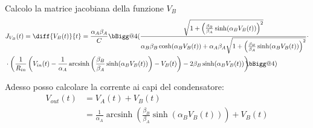 \documentclass[12pt,a4paper,twoside,english,italian]{book}
\makeatletter
\DeclareMathOperator{\arcsinh}{arcsinh}
\newcommand{\reallybig}{\bBigg@{4}}
\makeatother
\begin{document}
		Calcolo la matrice jacobiana della funzione $V_{B}$
		\begin{equation}
			\label{eq:jacobiana}
			\begin{split}
				&J_{V_{B}}(t) = \diff{V_{B}(t)}{t} = \frac{\alpha_{A}\beta_{A}}{C}\reallybig(\frac{\sqrt{1+\left(\frac{\beta_{B}}{\beta_{A}}\sinh(\alpha_{B}V_{B}(t))\right)^{2}}}{\alpha_{B}\beta_{B}\cosh(\alpha_{B}V_{B}(t))+\alpha_{A}\beta_{A}\sqrt{1+\left(\frac{\beta_{B}}{\beta_{A}}\sinh(\alpha_{B}V_{B}(t))\right)^{2}}}\cdot\\&\cdot\left(\frac{1}{R_{in}}\left(V_{in}(t)-\frac{1}{\alpha_{A}} \arcsinh \left(\frac{\beta_{B}}{\beta_{A}} \sinh(\alpha_{B}V_{B}(t))\right)-V_{B}(t)\right)-2\beta_{B}\sinh(\alpha_{B}V_{B}(t))\right)\hspace{-7px}\reallybig)
			\end{split}
		\end{equation}
		
		Adesso posso calcolare la corrente ai capi del condensatore:
		\begin{equation}
			\label{eq:punto_fisso2}
			\begin{split}
				V_{out}(t) &= V_{A}(t)+V_{B}(t)\\
				&= \frac{1}{\alpha_{A}} \arcsinh \left(\frac{\beta_{B}}{\beta_{A}} \sinh(\alpha_{B}V_{B}(t))\right)+V_{B}(t)
			\end{split}
		\end{equation}
	\pagebreak
	
	\backmatter
\end{document}
